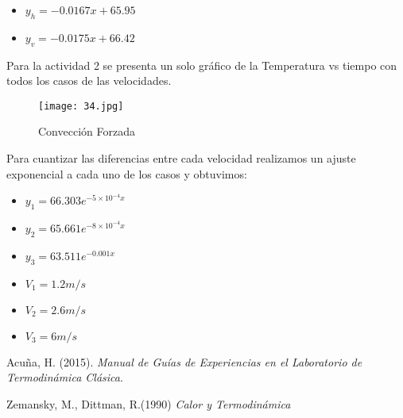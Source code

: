 \documentclass[12pt]{article}
\begin{document}
\begin{itemize}
\item $y_h = -0.0167x +65.95$
\item $y_v = -0.0175x +66.42$
\end{itemize}

\pagebreak

Para la actividad 2 se presenta un solo gráfico de la Temperatura vs tiempo con todos los casos de las velocidades.

\begin{figure}[H]
\begin{center}
\texttt{[image: 34.jpg]}  
\caption{Convección Forzada}
\label{uno}
\end{center}
\end{figure}

Para cuantizar las diferencias entre cada velocidad realizamos un ajuste exponencial a cada uno de los casos y obtuvimos:

\begin{itemize}
\item $y_1 = 66.303 e^{-5 \times 10^{-4} x}$
\item $y_2 = 65.661 e^{-8 \times 10^{-4} x}$
\item $y_3 = 63.511 e^{-0.001 x}$
\end{itemize}



\begin{itemize}
\item $V_1 = 1.2 m/s $
\item $V_2 = 2.6 m/s $
\item $V_3 = 6 m/s  $
\end{itemize}




\begin{thebibliography}{6}


Acuña, H. (2015). \textit{Manual de Guías de Experiencias en el Laboratorio de Termodinámica Clásica}.

Zemansky, M., Dittman, R.(1990) \textit{Calor y Termodinámica}


\end{thebibliography}
\end{document}
